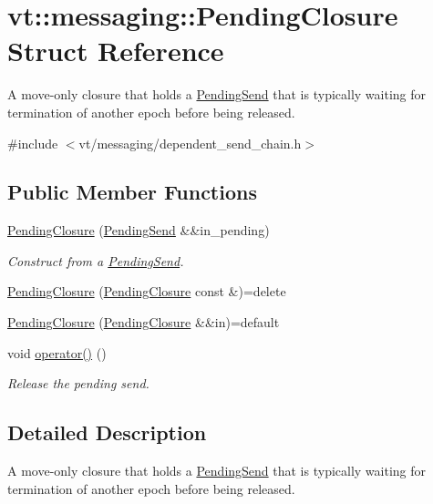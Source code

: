 \hypertarget{structvt_1_1messaging_1_1_pending_closure}{}\section{vt\+:\+:messaging\+:\+:Pending\+Closure Struct Reference}
\label{structvt_1_1messaging_1_1_pending_closure}


A move-\/only closure that holds a {\ttfamily \hyperlink{structvt_1_1messaging_1_1_pending_send}{Pending\+Send}} that is typically waiting for termination of another epoch before being released.  




{\ttfamily \#include $<$vt/messaging/dependent\+\_\+send\+\_\+chain.\+h$>$}

\subsection*{Public Member Functions}
\begin{DoxyCompactItemize}
\item 
\hyperlink{structvt_1_1messaging_1_1_pending_closure_aabf555d7b42f5d663b1ad499f09db9d4}{Pending\+Closure} (\hyperlink{structvt_1_1messaging_1_1_pending_send}{Pending\+Send} \&\&in\+\_\+pending)
\begin{DoxyCompactList}\small\item\em Construct from a {\ttfamily \hyperlink{structvt_1_1messaging_1_1_pending_send}{Pending\+Send}}. \end{DoxyCompactList}\item 
\hyperlink{structvt_1_1messaging_1_1_pending_closure_a3e703c1f2ff98d8e1a04ad4306a1f011}{Pending\+Closure} (\hyperlink{structvt_1_1messaging_1_1_pending_closure}{Pending\+Closure} const \&)=delete
\item 
\hyperlink{structvt_1_1messaging_1_1_pending_closure_aa0e2748116e95dd60b31ebfc6a5334c3}{Pending\+Closure} (\hyperlink{structvt_1_1messaging_1_1_pending_closure}{Pending\+Closure} \&\&in)=default
\item 
void \hyperlink{structvt_1_1messaging_1_1_pending_closure_a484d65eb7d32fde14253976927e37fd9}{operator()} ()
\begin{DoxyCompactList}\small\item\em Release the pending send. \end{DoxyCompactList}\end{DoxyCompactItemize}


\subsection{Detailed Description}
A move-\/only closure that holds a {\ttfamily \hyperlink{structvt_1_1messaging_1_1_pending_send}{Pending\+Send}} that is typically waiting for termination of another epoch before being released. 

